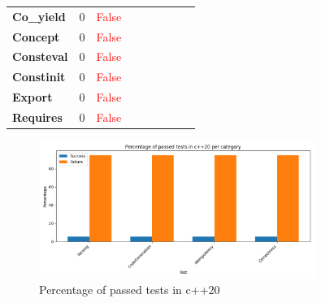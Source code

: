 \documentclass{article}
\begin{document}
\begin{xltabular}{\textwidth}{lcccccccc}
\textbf{{\fontsize{10}{12}\selectfont Co\_yield}}& 0&\textcolor{red}{False} \\[0.5ex]
\textbf{{\fontsize{10}{12}\selectfont Concept}}& 0&\textcolor{red}{False} \\[0.5ex]
\textbf{{\fontsize{10}{12}\selectfont Consteval}}& 0&\textcolor{red}{False} \\[0.5ex]
\textbf{{\fontsize{10}{12}\selectfont Constinit}}& 0&\textcolor{red}{False} \\[0.5ex]
\textbf{{\fontsize{10}{12}\selectfont Export}}& 0&\textcolor{red}{False} \\[0.5ex]
\textbf{{\fontsize{10}{12}\selectfont Requires}}& 0&\textcolor{red}{False} \\[0.5ex]
\bottomrule
\end{xltabular}
\newpage
\begin{figure}[h!]
\centering
\includegraphics[width=0.8\textwidth]{../reports/clava/images/c++20_percentage.png}
\caption{Percentage of passed tests in c++20}
\label{fig:c++20_percentage}
\end{figure}
\newpage
\end{document}
